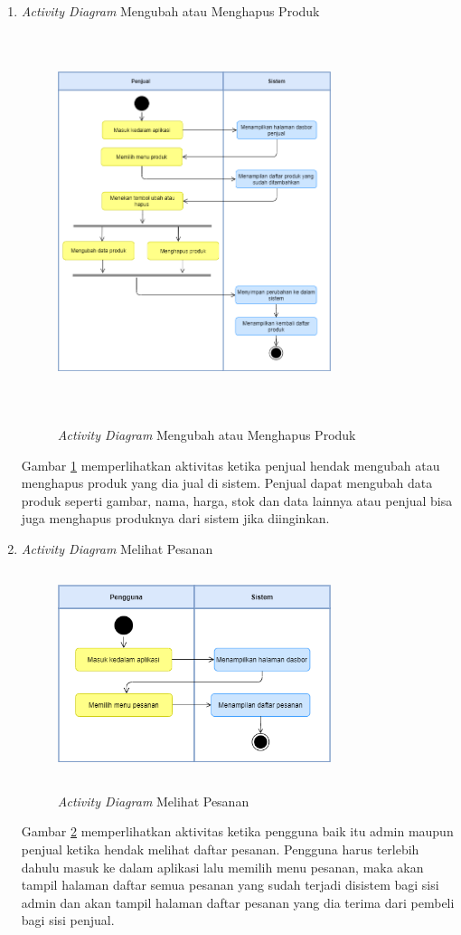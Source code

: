 \begin{enumerate}
	\newpage
	\item \textit{Activity Diagram} Mengubah atau Menghapus Produk
	\begin{figure}[H]
		\centering
		{\includegraphics [width = 8cm, height= 11cm]{gambar/activity diagram/ubah atau hapus produk}}
		\caption{\textit{Activity Diagram} Mengubah atau Menghapus Produk}
		\label{ubah atau hapus produk}
	\end{figure}
	\par Gambar \ref*{ubah atau hapus produk} memperlihatkan aktivitas ketika penjual hendak mengubah atau menghapus produk yang dia jual di sistem. Penjual dapat mengubah data produk seperti gambar, nama, harga, stok dan data lainnya atau penjual bisa juga menghapus produknya dari sistem jika diinginkan.

	\item \textit{Activity Diagram} Melihat Pesanan
	\begin{figure}[H]
		\centering
		{\includegraphics [width = 8cm, height= 6cm]{gambar/activity diagram/lihat pesanan}}
		\caption{\textit{Activity Diagram} Melihat Pesanan}
		\label{lihat pesanan}
	\end{figure}
	\par Gambar \ref*{lihat pesanan} memperlihatkan aktivitas ketika pengguna baik itu admin maupun penjual ketika hendak melihat daftar pesanan. Pengguna harus terlebih dahulu masuk ke dalam aplikasi lalu memilih menu pesanan, maka akan tampil halaman daftar semua pesanan yang sudah terjadi disistem bagi sisi admin dan akan tampil halaman daftar pesanan yang dia terima dari pembeli bagi sisi penjual.


\end{enumerate}
